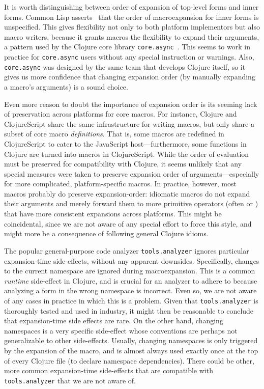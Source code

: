 It is worth distinguishing between order of expansion
of top-level forms and inner forms.
Common Lisp asserts~\cite{steele1990common} that the order
of macroexpansion for inner forms is unspecified.
This gives flexibility not only to both platform implementors
but also macro writers, because it grants macros the flexibility to
expand their arguments, a pattern
used by the Clojure core library \texttt{core.async}~\cite{CljCoreAsync}.
This seems to work in practice for \texttt{core.async} users
without any special instruction or warnings.
Also, \texttt{core.async} was designed
by the same team that develops Clojure itself,
so it gives us more confidence that changing expansion order
(by manually expanding a macro's arguments)
is a sound choice.

Even more reason to doubt the importance of expansion
order is its seeming lack of preservation 
across platforms for core macros.
For instance,
Clojure and ClojureScript share the same infrastructure for
writing macros, but only share a subset of core macro \emph{definitions}.
That is, some macros are redefined in ClojureScript to cater to the
JavaScript host---furthermore, some functions in Clojure are turned into macros
in ClojureScript.
While the order of evaluation must be preserved
for compatibility with Clojure,
it seems unlikely that any special measures were taken to preserve
expansion order of arguments---especially for more complicated,
platform-specific macros.
In practice, however, most macros probably do preserve expansion-order:
idiomatic macros do not expand their arguments
and merely forward them to more primitive operators
(often  or ) that have
more consistent expansions across platforms.
This might be coincidental, since
we are not aware of any special effort to force this style,
and might more be a consequence of following general Clojure idioms.

The popular general-purpose code analyzer \texttt{tools.analyzer} 
ignores particular expansion-time side-effects, without any
apparent downsides.
Specifically, changes to the current namespace are ignored
during macroexpansion. This is
a common \emph{runtime} side-effect in Clojure, and is crucial for
an analyzer to adhere to because analyzing a form in the
wrong namespace is incorrect.
Even so, we are not aware of any cases in practice in which this is a problem.
Given that \texttt{tools.analyzer} is thoroughly tested and used
in industry, it might then be reasonable to conclude that expansion-time side effects
are rare. On the other hand, changing namespaces is a very specific side-effect
whose conventions are perhaps not generalizable to other side-effects.
Usually, changing namespaces is only triggered by the expansion of the  macro,
and  is almost always used exactly once at the top of every Clojure file (to declare
namespace dependencies). There could be other, more common expansion-time
side-effects that are compatible with \texttt{tools.analyzer} that
we are not aware of.

